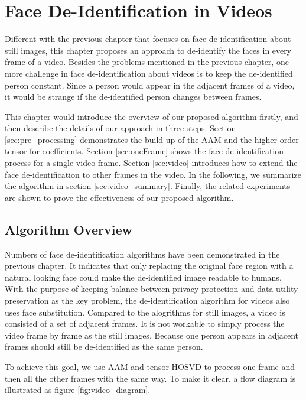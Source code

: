 \chapter{Face De-Identification in Videos}
\label{chap:FDvideos}

	Different with the previous chapter that focuses on face 
	de-identification about still images, this chapter proposes 
	an approach to de-identify the faces in every frame of a 
	video. Besides the problems mentioned in the previous chapter,
	one more challenge in face de-identification about videos is
	to keep the de-identified person constant. Since a person
	would appear in the adjacent frames of a video, it would be
	strange if the de-identified person changes between frames.  


	This chapter would introduce the overview of our proposed algorithm firstly,
	and then describe the details of our approach in three steps. Section \ref{sec:pre_processing}
	demonstrates the build up of the AAM and the higher-order tensor for 
	coefficients. Section \ref{sec:oneFrame} shows the face de-identification process for a single 
  	video frame. Section \ref{sec:video} introduces how to extend the face de-identification 
  	to other frames in the video. In the following, we summarize the algorithm in section 
  	\ref{sec:video_summary}. Finally, the related experiments are shown to prove the effectiveness
  	of our proposed algorithm.

\section{Algorithm Overview}
\label{sec:algorithm}
	Numbers of face de-identification algorithms have been demonstrated
	in the previous chapter. It indicates that only replacing the original
	face region with a natural looking face could make the de-identified
	image readable to humans. With the purpose of keeping balance between
	privacy protection and data utility preservation as the key problem,
	the de-identification algorithm for videos also uses face substitution.
	Compared to the alogrithms for still images, a video is consisted of
	a set of adjacent frames. It is not workable to simply process the video
	frame by frame as the still images. Because one person appears in adjacent
	frames should still be de-identified as the same person. 

	To achieve this goal, we use AAM and tensor HOSVD to process one frame
	and then all the other frames with the same way. To make it clear, a flow 
	diagram is illustrated as figure \ref{fig:video_diagram}.

